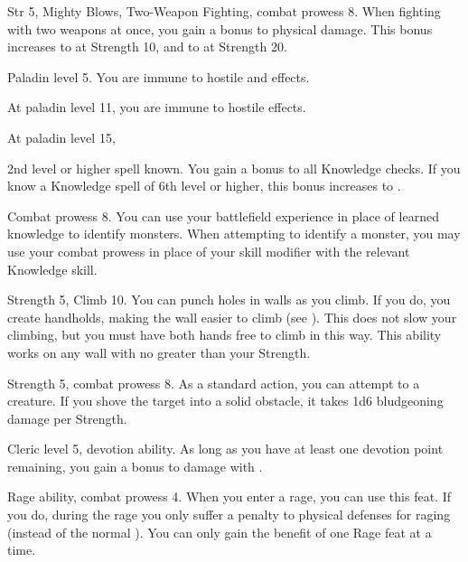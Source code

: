 \featpres Str 5, Mighty Blows, Two-Weapon Fighting, combat prowess 8.
\featben When fighting with two weapons at once, you gain a  bonus to physical damage.
This bonus increases to  at Strength 10, and to  at Strength 20.

\featpre Paladin level 5.
\featben You are immune to hostile  and  effects.

At paladin level 11, you are immune to hostile  effects.

At paladin level 15, 

\featpre 2nd level or higher  spell known.
\featben You gain a  bonus to all Knowledge checks.
If you know a Knowledge spell of 6th level or higher, this bonus increases to .

\featpre Combat prowess 8.
\featben You can use your battlefield experience in place of learned knowledge to identify monsters.
When attempting to identify a monster, you may use your combat prowess in place of your skill modifier with the relevant Knowledge skill.

\featpres Strength 5, Climb 10.
\featben You can punch holes in walls as you climb.
If you do, you create handholds, making the wall easier to climb (see ).
This does not slow your climbing, but you must have both hands free to climb in this way.
This ability works on any wall with  no greater than your Strength.

\featpres Strength 5, combat prowess 8.
\featben As a standard action, you can attempt to  a creature.
If you shove the target into a solid obstacle, it takes 1d6 bludgeoning damage per Strength.

\featpres Cleric level 5, devotion ability.
\featben As long as you have at least one devotion point remaining, you gain a  bonus to damage with .

\featpres Rage ability, combat prowess 4.
\featben When you enter a rage, you can use this feat. If you do, during the rage you only suffer a  penalty to physical defenses for raging (instead of the normal ).
 You can only gain the benefit of one Rage feat at a time.

